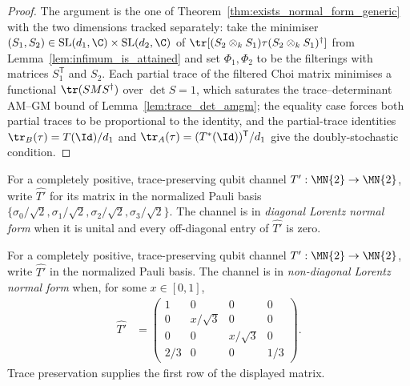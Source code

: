 \begin{proof}\leanok
    The argument is the one of Theorem~\ref{thm:exists_normal_form_generic}
    with the two dimensions tracked separately: take the minimiser
    $(S_{1},S_{2})\in\mathrm{SL}(d_1,\C)\times\mathrm{SL}(d_2,\C)$ of
    $\tr[(S_{2}\otimes_{k}S_{1})\tau(S_{2}\otimes_{k}S_{1})^{\dagger}]$
    from Lemma~\ref{lem:infimum_is_attained} and set $\Phi_{1},\Phi_{2}$ to
    be the filterings with matrices $S_{1}^{\mathsf T}$ and $S_{2}$.  Each
    partial trace of the filtered Choi matrix minimises a functional
    $\tr(SMS^{\dagger})$ over $\det S=1$, which saturates the
    trace--determinant AM--GM bound of Lemma~\ref{lem:trace_det_amgm}; the
    equality case forces both partial traces to be proportional to the
    identity, and the partial-trace identities
    $\tr_B(\tau)=T(\Id)/d_1$ and $\tr_A(\tau)=(T^{*}(\Id))^{\mathsf T}/d_1$
    give the doubly-stochastic condition.
\end{proof}

\begin{definition}\label{def:lorentz_diagonal}
    \leanok
    For a completely positive, trace-preserving qubit channel
    $T' : \MN{2} \to \MN{2}$, write $\widehat{T'}$ for its matrix
    in the normalized Pauli basis
    $\{\sigma_{0}/\sqrt{2},\sigma_{1}/\sqrt{2},
        \sigma_{2}/\sqrt{2},\sigma_{3}/\sqrt{2}\}$. The channel is in
    \emph{diagonal Lorentz normal form} when it is unital and every
    off-diagonal entry of $\widehat{T'}$ is zero.
\end{definition}

\begin{definition}\label{def:lorentz_non_diagonal}
    \leanok
    For a completely positive, trace-preserving qubit channel
    $T' : \MN{2} \to \MN{2}$, write $\widehat{T'}$ in the normalized
    Pauli basis. The channel is in \emph{non-diagonal Lorentz normal form}
    when, for some $x \in [0,1]$,
    \begin{align}
        \widehat{T'}
        &=
        \begin{pmatrix}
            1   & 0          & 0          & 0   \\
            0   & x/\sqrt{3} & 0          & 0   \\
            0   & 0          & x/\sqrt{3} & 0   \\
            2/3 & 0          & 0          & 1/3
        \end{pmatrix}.
        \label{eq:representations_lorentz_nondiagonal}
    \end{align}
    Trace preservation supplies the first row of the displayed matrix.
\end{definition}

